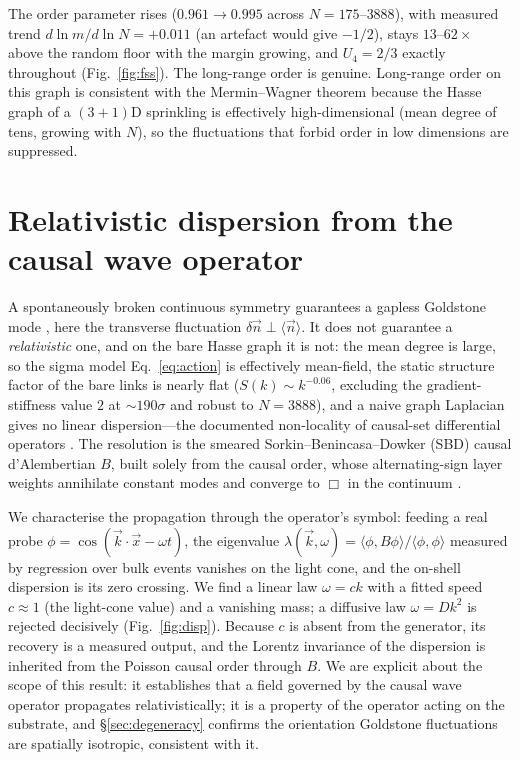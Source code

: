 \documentclass[aps,prd,reprint,nofootinbib,superscriptaddress,floatfix]{revtex4-2}
\begin{document}
The order parameter rises ($0.961\to0.995$ across $N=175$--$3888$), with measured trend
$d\ln m/d\ln N=+0.011$ (an artefact would give $-1/2$), stays $13$--$62\times$ above
the random floor with the margin growing, and $U_4=2/3$ exactly throughout
(Fig.~\ref{fig:fss}). The
long-range order is genuine. Long-range order on this graph is consistent with the
Mermin--Wagner theorem because the Hasse graph of a $(3{+}1)$D sprinkling is
effectively high-dimensional (mean degree of tens, growing with $N$), so the
fluctuations that forbid order in low dimensions are suppressed.

\section{Relativistic dispersion from the causal wave operator}\label{sec:dispersion}

A spontaneously broken continuous symmetry guarantees a gapless Goldstone mode
\cite{Goldstone1961}, here the transverse fluctuation $\delta\vec n\perp\langle\vec
n\rangle$. It does not guarantee a \emph{relativistic} one, and on the bare Hasse
graph it is not: the mean degree is large, so the sigma model
Eq.~\eqref{eq:action} is effectively mean-field, the static structure factor of the bare
links is nearly flat ($S(k)\sim k^{-0.06}$, excluding the gradient-stiffness value $2$ at
$\sim190\sigma$ and robust to $N=3888$), and a naive graph Laplacian gives no linear
dispersion---the
documented non-locality of causal-set differential operators
\cite{Sorkin2007,BenincasaDowker2010}. The resolution is the smeared
Sorkin--Benincasa--Dowker (SBD) causal d'Alembertian $B$, built solely from the
causal order, whose alternating-sign layer weights annihilate constant modes and
converge to $\Box$ in the continuum \cite{BenincasaDowker2010,DowkerGlaser2013}.

We characterise the propagation through the operator's symbol: feeding a real probe
$\phi=\cos(\vec k\!\cdot\!\vec x-\omega t)$, the eigenvalue
$\lambda(\vec k,\omega)=\langle\phi,B\phi\rangle/\langle\phi,\phi\rangle$ measured by
regression over bulk events vanishes on the light cone, and the on-shell dispersion
is its zero crossing. We find a linear law $\omega=ck$ with a fitted speed
$c\approx1$ (the light-cone value) and a vanishing mass; a diffusive law
$\omega=Dk^2$ is rejected decisively (Fig.~\ref{fig:disp}). Because $c$ is absent
from the generator, its recovery is a measured output, and the Lorentz invariance of
the dispersion is inherited from the Poisson causal order through $B$. We are
explicit about the scope of this result: it establishes that a field governed by the
causal wave operator propagates relativistically; it is a property of the operator
acting on the substrate, and \S\ref{sec:degeneracy} confirms the orientation
Goldstone fluctuations are spatially isotropic, consistent with it.
\end{document}
